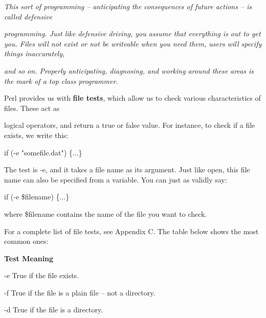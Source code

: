 \documentclass[a4paper,11pt]{book}
\begin{document}
\noindent 

\noindent 

\noindent \textit{This  sort of programming  -- anticipating  the  consequences  of  future  actions  --  is  called  defensive}

\noindent \textit{programming.  Just like  defensive  driving,  you  assume  that  everything  is  out to  get you.  Files will  not exist or  not be  writeable  when  you  need  them,  users  will  specify  things  inaccurately,}

\noindent \textit{and  so on.  Properly  anticipating,  diagnosing,  and  working  around  these  areas  is  the  mark  of  a top class programmer.}

\noindent 

\noindent 

\noindent Perl provides us with \textbf{file tests}, which allow us to check various characteristics of files. These act as

\noindent logical operators, and return a true or false value. For instance, to check if a file exists, we write this:

\noindent 

\noindent if (-e "somefile.dat") \{...\}

\noindent 

\noindent The test is -e, and it takes a file name as its argument. Just like open, this file name can also be specified from a variable. You can just as validly say:

\noindent 

\noindent if (-e \$filename) \{...\}

\noindent 

\noindent where \$filename contains the name of the file you want to check.

\noindent 

\noindent For a complete list of file tests, see Appendix C. The table below shows the most common ones:

\noindent 

\noindent \textbf{Test Meaning}

\noindent 

\noindent -e True if the file exists.

\noindent 

\noindent -f True if the file is a plain file -- not a directory.

\noindent 

\noindent -d True if the file is a directory.
\end{document}
